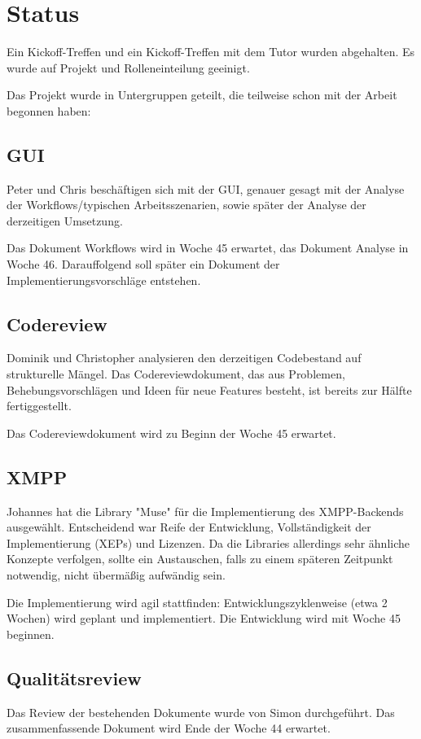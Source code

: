\setcounter{chapter}{1}
\section{Status}
Ein Kickoff-Treffen und ein Kickoff-Treffen mit dem Tutor wurden abgehalten.
Es wurde auf Projekt und Rolleneinteilung geeinigt.

Das Projekt wurde in Untergruppen geteilt, die teilweise schon mit der Arbeit 
begonnen haben: 

\subsection{GUI}
Peter und Chris beschäftigen sich mit der GUI, genauer gesagt mit der Analyse 
der Workflows/typischen Arbeitsszenarien, sowie später der Analyse der 
derzeitigen Umsetzung. 

Das Dokument Workflows wird in Woche 45 erwartet, das Dokument Analyse in 
Woche 46. Darauffolgend soll später ein Dokument der Implementierungsvorschläge entstehen.

\subsection{Codereview}
Dominik und Christopher analysieren den derzeitigen Codebestand auf 
strukturelle Mängel. Das Codereviewdokument, das aus Problemen, 
Behebungsvorschlägen und Ideen für neue Features besteht, ist bereits zur Hälfte 
fertiggestellt.

Das Codereviewdokument wird zu Beginn der Woche 45 erwartet.

\subsection{XMPP}
Johannes hat die Library "Muse" für die Implementierung des XMPP-Backends 
ausgewählt. Entscheidend war Reife der Entwicklung, Vollständigkeit der 
Implementierung (XEPs) und Lizenzen. Da die Libraries allerdings sehr ähnliche
Konzepte verfolgen, sollte ein Austauschen, falls zu einem späteren Zeitpunkt 
notwendig, nicht übermäßig aufwändig sein.

Die Implementierung wird agil stattfinden: Entwicklungszyklenweise (etwa 2 
Wochen) wird geplant und implementiert. Die Entwicklung wird mit Woche 45 
beginnen.

\subsection{Qualitätsreview}
Das Review der bestehenden Dokumente wurde von Simon durchgeführt. 
Das zusammenfassende Dokument wird Ende der Woche 44 erwartet.

